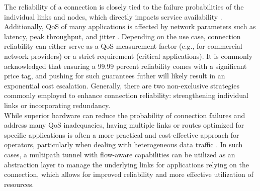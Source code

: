 The reliability of a connection is closely tied to the failure probabilities of the individual links and nodes, which directly impacts service availability \cite{shooman_algorithms_1995}. 
Additionally, \ac{QoS} of many applications is affected by network parameters such as latency, peak throughput, and jitter \cite{gozdecki_quality_2003}.
Depending on the use case, connection reliability can either serve as a \ac{QoS} measurement factor (e.g., for commercial network providers) or a strict requirement (critical applications). 
It is commonly acknowledged that ensuring a 99.99 percent reliability comes with a significant price tag, and pushing for such guarantees futher will likely result in an exponential cost escalation.
Generally, there are two non-exclusive strategies commonly employed to enhance connection reliability: strengthening individual links or incorporating redundancy.
\\

While superior hardware can reduce the probability of connection failures and address many \ac{QoS} inadequacies, having multiple links or routes optimized for specific applications is often a more practical and cost-effective approach for operators, particularly when dealing with heterogeneous data traffic \cite{chen_overview_1998}.
In such cases, a multipath tunnel with flow-aware capabilities can be utilized as an abstraction layer to manage the underlying links for applications relying on the connection, which allows for improved reliability and more effective utilization of resources. 



